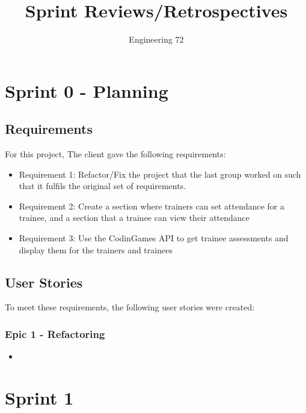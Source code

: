 \documentclass[]{report}
\title{Sprint Reviews/Retrospectives}
\author{Engineering 72}
\begin{document}
	\maketitle
	
	\tableofcontents
	
	\chapter*{Sprint 0 - Planning}
		\section*{Requirements}
			For this project, The client gave the following requirements:
			\begin{itemize}
				\item Requirement 1: Refactor/Fix the project that the last group worked on such that it fulfils the original set of requirements.
				\item Requirement 2: Create a section where trainers can set attendance for a trainee, and a section that a trainee can view their attendance
				\item Requirement 3: Use the CodinGames API to get trainee assessments and display them for the trainers and trainees
			\end{itemize}
		\section*{User Stories}
			To meet these requirements, the following user stories were created:
			\subsection*{Epic 1 - Refactoring}
				\begin{itemize}
					\item 
				\end{itemize}
	\chapter*{Sprint 1}
\end{document}
